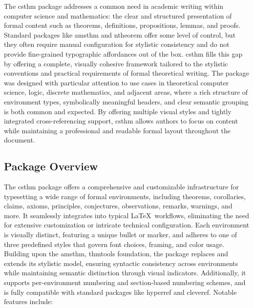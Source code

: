 \documentclass[10pt,letterpaper]{amsart}
\begin{document}
The \textsf{csthm} package addresses a common need in academic writing within
computer science and mathematics: the clear and structured presentation of
formal content such as theorems, definitions, propositions, lemmas, and proofs.
Standard packages like \textsf{amsthm} and \textsf{ntheorem} offer some level
of control, but they often require manual configuration for stylistic
consistency and do not provide fine-grained typographic affordances out of the
box. \textsf{csthm} fills this gap by offering a complete, visually cohesive
framework tailored to the stylistic conventions and practical requirements of
formal theoretical writing. The package was designed with particular attention
to use cases in theoretical computer science, logic, discrete mathematics, and
adjacent areas, where a rich structure of environment types, symbolically
meaningful headers, and clear semantic grouping is both common and expected. By
offering multiple visual styles and tightly integrated cross-referencing
support, \textsf{csthm} allows authors to focus on content while maintaining a
professional and readable formal layout throughout the document.

\subsection{Package Overview}

The \textsf{csthm} package offers a comprehensive and customizable
infrastructure for typesetting a wide range of formal environments, including
theorems, corollaries, claims, axioms, principles, conjectures, observations,
remarks, warnings, and more. It seamlessly integrates into typical \LaTeX\
workflows, eliminating the need for extensive customization or intricate
technical configuration. Each environment is visually distinct, featuring a
unique bullet or marker, and adheres to one of three predefined styles that
govern font choices, framing, and color usage. Building upon the
\textsf{amsthm, thmtools} foundation, the package replaces and extends its
stylistic model, ensuring syntactic consistency across environments while
maintaining semantic distinction through visual indicators. Additionally, it
supports per-environment numbering and section-based numbering schemes, and is
fully compatible with standard packages like \textsf{hyperref} and
\textsf{cleveref}. Notable features include:
\end{document}
